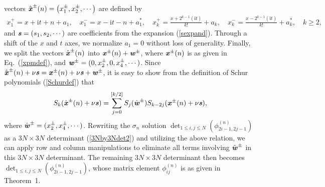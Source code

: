 \documentclass[amsmath,amssymb]{revtex4}
\def\[{\begin{equation}}
\def\]{\end{equation}}
\begin{document}
vectors $\hat{\textbf{\emph{x}}}^{\pm}(n)=\left( x_{1}^{\pm}, x_{2}^{\pm},\cdots \right)$ are defined by
\begin{eqnarray}
x_{1}^{+}=x + \textrm{i} t + n+a_1, \quad x_{1}^{-}=x -\textrm{i} t - n+a_1^*,
\quad x_{k}^{+}= \frac{x+2^{k-1} (\textrm{i} t)}{k!} +a_{k},    \quad x_{k}^{-}=  \frac{x-2^{k-1} (\textrm{i} t)}{k!}+ a_{k}^*, \quad k\ge 2,
\end{eqnarray}
and $\textbf{\emph{s}}=(s_1, s_2, \cdots)$ are coefficients from the expansion (\ref{sexpand}). Through a shift of the $x$ and $t$ axes, we normalize $a_1=0$ without loss of generality. Finally, we split the vectors $\hat{\textbf{\emph{x}}}^{\pm}(n)$ into $\textbf{\emph{x}}^{\pm}(n)+\textbf{\emph{w}}^{\pm}$, where $\textbf{\emph{x}}^{\pm}(n)$ is as given in Eq.~(\ref{xpmdef}), and $\textbf{\emph{w}}^{\pm}=(0, x_{2}^{\pm}, 0, x_{4}^{\pm}, \cdots)$. Since $\hat{\textbf{\emph{x}}}^{\pm}(n) +\nu \textbf{\emph{s}}=\textbf{\emph{x}}^{\pm}(n) +\nu \textbf{\emph{s}} + \textbf{\emph{w}}^{\pm}$, it is easy to show from the definition of Schur polynomials (\ref{Schurdef}) that
\[
S_{k}(\hat{\textbf{\emph{x}}}^{\pm}(n) +\nu \textbf{\emph{s}})=\sum_{j=0}^{\left[ k/2 \right]} S_{j}(\hat{\textbf{\emph{w}}}^\pm) S_{k-2j}(\textbf{\emph{x}}^{\pm}(n)+\nu \textbf{\emph{s}}),
\]
where $\hat{\textbf{\emph{w}}}^\pm=(x_{2}^{\pm}, x_{4}^{\pm}, \cdots)$. Rewriting the $\sigma_n$ solution $\det_{1\le i,j\le N}\left(\phi_{2i-1,2j-1}^{(n)}\right)$ as a $3N\times 3N$ determinant (\ref{3Nby3Ndet2})
and utilizing the above relation, we can apply row and column manipulations to eliminate all terms involving $\hat{\textbf{\emph{w}}}^\pm$ in this $3N\times 3N$ determinant. The remaining $3N\times 3N$ determinant then becomes $\det_{1\le i,j\le N}\left(\phi_{2i-1,2j-1}^{(n)}\right)$, whose matrix element $\phi_{ij}^{(n)}$ is as given in Theorem~1.
\end{document}
